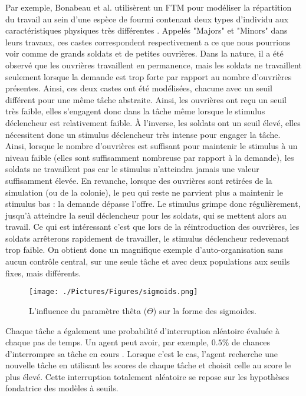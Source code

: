         Par exemple, Bonabeau et al. \cite{bonabeau_quantitative_1996} utilisèrent un FTM pour modéliser la répartition du travail au sein d'une espèce de fourmi contenant deux types d'individu aux caractéristiques physiques très différentes \cite{wilson_relation_1984}. Appelés "Majors" et "Minors" dans leurs travaux, ces castes correspondent respectivement a ce que nous pourrions voir comme de grands soldats et de petites ouvrières. Dans la nature, il a été observé que les ouvrières travaillent en permanence, mais les soldats ne travaillent seulement lorsque la demande est trop forte par rapport au nombre d'ouvrières présentes. Ainsi, ces deux castes ont été modélisées, chacune avec un seuil différent pour une même tâche abstraite. Ainsi, les ouvrières ont reçu un seuil très faible, elles s'engagent donc dans la tâche même lorsque le stimulus déclencheur est relativement faible. À l'inverse, les soldats ont un seuil élevé, elles nécessitent donc un stimulus déclencheur très intense pour engager la tâche. Ainsi, lorsque le nombre d'ouvrières est suffisant pour maintenir le stimulus à un niveau faible (elles sont suffisamment nombreuse par rapport à la demande), les soldats ne travaillent pas car le stimulus n'atteindra jamais une valeur suffisamment élevée. En revanche, lorsque des ouvrières sont retirées de la simulation (ou de la colonie), le peu qui reste ne parvient plus a maintenir le stimulus bas : la demande dépasse l'offre. Le stimulus grimpe donc régulièrement, jusqu'à atteindre la seuil déclencheur pour les soldats, qui se mettent alors au travail. Ce qui est intéressant c'est que lors de la réintroduction des ouvrières, les soldats arrêterons rapidement de travailler, le stimulus déclencheur redevenant trop faible. On obtient donc un magnifique exemple d'auto-organisation sans aucun contrôle central, sur une seule tâche et avec deux populations aux seuils fixes, mais différents.
		
		\begin{figure}
		\centering
		\texttt{[image: ./Pictures/Figures/sigmoids.png]}
		\caption{L'influence du paramètre thêta ($\Theta$) sur la forme des sigmoides.}
		\label{sigmoids}
		\end{figure}
		
		Chaque tâche a également une probabilité d'interruption aléatoire évaluée à chaque pas de temps. Un agent peut avoir, par exemple, $0.5\%$ de chances d'interrompre sa tâche en cours \cite{schmickl_analysing_2008}. Lorsque c'est le cas, l'agent recherche une nouvelle tâche en utilisant les scores de chaque tâche et choisit celle au score le plus élevé. Cette interruption totalement aléatoire se repose sur les hypothèses fondatrice des modèles à seuils.
        
